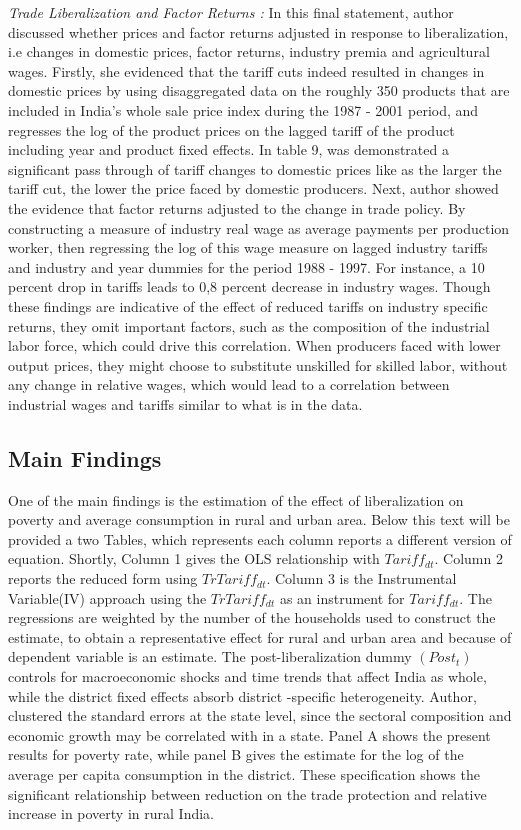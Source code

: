 \documentclass[a4paper,12pt]{article}
\begin{document}
\textit{Trade Liberalization and Factor Returns : } In this final statement, author discussed whether prices and factor returns adjusted in response to liberalization, i.e changes in domestic prices, factor returns, industry premia and agricultural wages.  Firstly, she evidenced that the tariff cuts indeed resulted in changes in domestic prices by using disaggregated data on the roughly 350 products that are included in India's whole sale price index during the 1987 - 2001 period, and regresses the log of the product prices on the lagged tariff of the product including year and product fixed effects. In table 9, was demonstrated a significant pass through of tariff changes to domestic prices like as the larger the tariff cut, the lower the price faced by domestic producers. Next, author showed the evidence that factor returns adjusted to the change in trade policy.  By constructing a measure of industry real wage as average payments per production worker, then regressing the log of this wage measure on lagged industry tariffs and industry and year dummies for the period 1988 - 1997. For instance, a 10 percent drop in tariffs leads to 0,8 percent decrease in industry wages.  Though these findings are indicative of the effect of reduced tariffs on industry specific returns, they omit important factors, such as the composition of the industrial labor force, which could drive this correlation. When producers faced with lower output prices, they might choose to substitute unskilled for skilled labor, without any change in relative wages, which would lead to a correlation between industrial wages and tariffs similar to what is in the data.  





\subsection{Main Findings}
One of the main findings is the estimation of the effect of liberalization on poverty and average consumption in rural and urban area. Below this text will be provided a two Tables, which represents each column reports a different version of equation. Shortly, Column 1 gives the OLS relationship with $Tariff_{dt}$. Column 2 reports the reduced form using $TrTariff_{dt}$. Column 3 is the Instrumental Variable(IV) approach using the $TrTariff_{dt}$ as an instrument for $Tariff_{dt}$. The regressions are weighted by the number of the households used to construct the estimate, to obtain a representative effect for rural and urban area and because of dependent variable is an estimate. The post-liberalization dummy $(Post_t)$ controls for macroeconomic shocks and time trends that affect India as whole, while the district fixed effects absorb district -specific heterogeneity. Author, clustered the standard errors at the state level, since the sectoral composition and economic growth may be correlated with in a state. Panel A shows the present results for poverty rate, while panel B gives the estimate for the log of the average per capita consumption in the district. These specification shows the significant relationship between reduction on the trade protection and relative increase in poverty in rural India.
\end{document}
